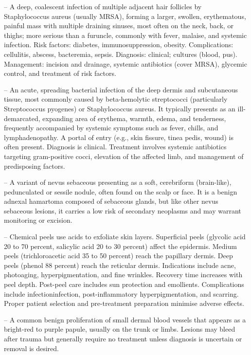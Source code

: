 -- A deep, coalescent infection of multiple adjacent hair follicles by Staphylococcus aureus (usually MRSA), forming a larger, swollen, erythematous, painful mass with multiple draining sinuses, most often on the neck, back, or thighs; more serious than a furuncle, commonly with fever, malaise, and systemic infection. Risk factors: diabetes, immunosuppression, obesity. Complications: cellulitis, abscess, bacteremia, sepsis. Diagnosis: clinical; cultures (blood, pus). Management: incision and drainage, systemic antibiotics (cover MRSA), glycemic control, and treatment of risk factors.

-- An acute, spreading bacterial infection of the deep dermis and subcutaneous tissue, most commonly caused by beta-hemolytic streptococci (particularly Streptococcus pyogenes) or Staphylococcus aureus. It typically presents as an ill-demarcated, expanding area of erythema, warmth, edema, and tenderness, frequently accompanied by systemic symptoms such as fever, chills, and lymphadenopathy. A portal of entry (e.g., skin fissure, tinea pedis, wound) is often present. Diagnosis is clinical. Treatment involves systemic antibiotics targeting gram-positive cocci, elevation of the affected limb, and management of predisposing factors.

-- A variant of nevus sebaceous presenting as a soft, cerebriform (brain-like), pedunculated or sessile nodule, often found on the scalp or face. It is a benign adnexal hamartoma composed of sebaceous glands, but like other nevus sebaceous lesions, it carries a low risk of secondary neoplasms and may warrant monitoring or excision.

-- Chemical peels use acids to exfoliate skin layers. Superficial peels (glycolic acid 20 to 70 percent, salicylic acid 20 to 30 percent) affect the epidermis. Medium peels (trichloroacetic acid 35 to 50 percent) reach the papillary dermis. Deep peels (phenol 88 percent) reach the reticular dermis. Indications include acne, photoaging, hyperpigmentation, and fine wrinkles. Recovery time increases with peel depth. Post-peel care includes sun protection and emollients. Complications include infectioninfection, post-inflammatory hyperpigmentation, and scarring. Proper patient selection and pre-treatment preparation minimise adverse effects.

-- A common benign proliferation of small dermal blood vessels that appears as a bright-red to purple papule, usually on the trunk or limbs. Lesions may bleed after trauma but generally require no treatment unless diagnosis is uncertain or removal is desired.

